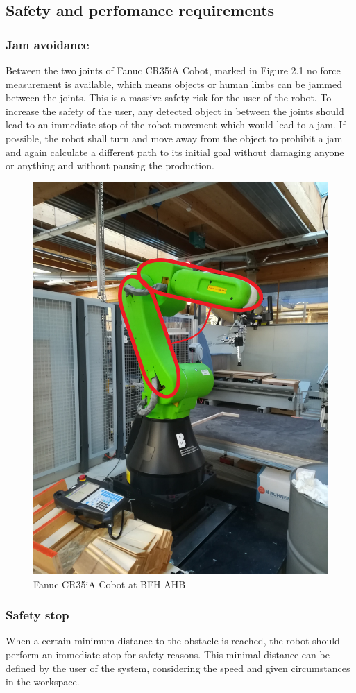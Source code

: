 \subsection{Safety and perfomance requirements}
\subsubsection{Jam avoidance}
\label{subsec:jamavoid}
Between the two joints of Fanuc CR35iA Cobot, marked in Figure 2.1 no force measurement is available, which means objects or human limbs can be jammed between the joints. This is a massive safety risk for the user of the robot. To increase the safety of the user, any detected object in between the joints should lead to an immediate stop of the robot movement which would lead to a jam. If possible, the robot shall turn and move away from the object to prohibit a jam and again calculate a different path to its initial goal without damaging anyone or anything and without pausing the production.

\begin{figure}[h]
	\begin{center}
		\centering
		\includegraphics[width=0.40\linewidth]{images/fanuc_joint.jpg}
		\caption{Fanuc CR35iA Cobot at BFH AHB}
		\label{fig:fanucrob}
	\end{center}
\end{figure}

\subsubsection{Safety stop}
\label{subsec:safetystop}
When a certain minimum distance to the obstacle is reached, the robot should perform an immediate stop for safety reasons. 
This minimal distance can be defined by the user of the system, considering the speed and given circumstances in the workspace.

